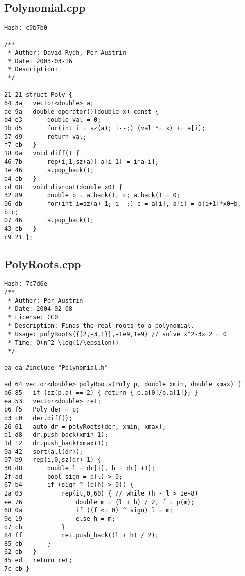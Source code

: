 \documentclass[11pt, a4paper, twoside]{article}
\begin{document}
\subsection{Polynomial.cpp}
\begin{lstlisting}
Hash: c9b7b0
 
/**
 * Author: David Rydh, Per Austrin
 * Date: 2003-03-16
 * Description:
 */

21 21 struct Poly {
64 3a 	vector<double> a;
ae 9a 	double operator()(double x) const {
b4 e3 		double val = 0;
1b d5 		for(int i = sz(a); i--;) (val *= x) += a[i];
37 d9 		return val;
f7 cb 	}
18 0a 	void diff() {
46 7b 		rep(i,1,sz(a)) a[i-1] = i*a[i];
1e 46 		a.pop_back();
d4 cb 	}
cd 08 	void divroot(double x0) {
32 89 		double b = a.back(), c; a.back() = 0;
06 db 		for(int i=sz(a)-1; i--;) c = a[i], a[i] = a[i+1]*x0+b, b=c;
07 46 		a.pop_back();
43 cb 	}
c9 21 };
\end{lstlisting}

\subsection{PolyRoots.cpp}
\begin{lstlisting}
Hash: 7c7d6e
/**
 * Author: Per Austrin
 * Date: 2004-02-08
 * License: CC0
 * Description: Finds the real roots to a polynomial.
 * Usage: polyRoots({{2,-3,1}},-1e9,1e9) // solve x^2-3x+2 = 0
 * Time: O(n^2 \log(1/\epsilon))
 */

ea ea #include "Polynomial.h"

ad 64 vector<double> polyRoots(Poly p, double xmin, double xmax) {
b6 85 	if (sz(p.a) == 2) { return {-p.a[0]/p.a[1]}; }
ea 53 	vector<double> ret;
b6 f5 	Poly der = p;
d3 c0 	der.diff();
26 61 	auto dr = polyRoots(der, xmin, xmax);
a1 d8 	dr.push_back(xmin-1);
1d 12 	dr.push_back(xmax+1);
9a 42 	sort(all(dr));
07 b9 	rep(i,0,sz(dr)-1) {
30 d8 		double l = dr[i], h = dr[i+1];
2f ad 		bool sign = p(l) > 0;
67 b4 		if (sign ^ (p(h) > 0)) {
2a 03 			rep(it,0,60) { // while (h - l > 1e-8)
ee 76 				double m = (l + h) / 2, f = p(m);
68 0a 				if ((f <= 0) ^ sign) l = m;
9e 19 				else h = m;
d7 cb 			}
84 ff 			ret.push_back((l + h) / 2);
85 cb 		}
62 cb 	}
45 ed 	return ret;
7c cb }
\end{lstlisting}
\end{document}
